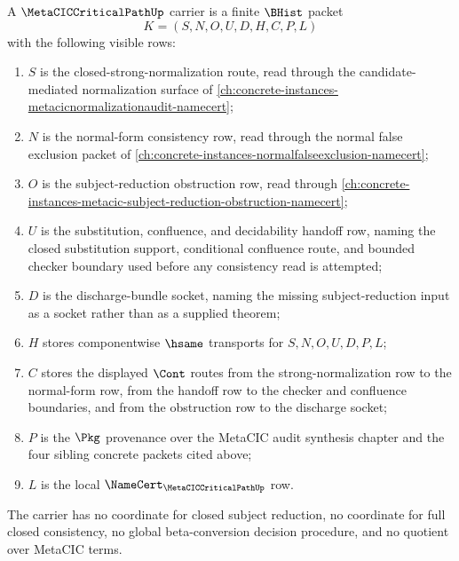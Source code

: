 \begin{definition}
\label{def:metacic-critical-path-packet}
A $\MetaCICCriticalPathUp$ carrier is a finite $\BHist$ packet
$$
K=(S,N,O,U,D,H,C,P,L)
$$
with the following visible rows:
\begin{enumerate}
\item $S$ is the closed-strong-normalization route, read through the candidate-mediated normalization surface of \autoref{ch:concrete-instances-metacicnormalizationaudit-namecert};
\item $N$ is the normal-form consistency row, read through the normal false exclusion packet of \autoref{ch:concrete-instances-normalfalseexclusion-namecert};
\item $O$ is the subject-reduction obstruction row, read through \autoref{ch:concrete-instances-metacic-subject-reduction-obstruction-namecert};
\item $U$ is the substitution, confluence, and decidability handoff row, naming the closed substitution support, conditional confluence route, and bounded checker boundary used before any consistency read is attempted;
\item $D$ is the discharge-bundle socket, naming the missing subject-reduction input as a socket rather than as a supplied theorem;
\item $H$ stores componentwise $\hsame$ transports for $S,N,O,U,D,P,L$;
\item $C$ stores the displayed $\Cont$ routes from the strong-normalization row to the normal-form row, from the handoff row to the checker and confluence boundaries, and from the obstruction row to the discharge socket;
\item $P$ is the $\Pkg$ provenance over the MetaCIC audit synthesis chapter and the four sibling concrete packets cited above;
\item $L$ is the local $\NameCert_{\MetaCICCriticalPathUp}$ row.
\end{enumerate}
The carrier has no coordinate for closed subject reduction, no coordinate for full closed consistency, no global beta-conversion decision procedure, and no quotient over MetaCIC terms.
\end{definition}

